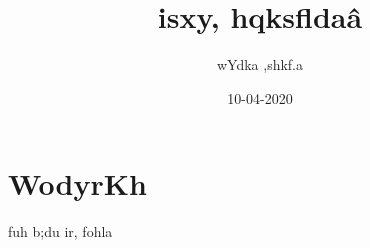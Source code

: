 \documentclass[12pt]{article}
\title{isxy, \fontencoding{T1}\fontfamily{cmr}\selectfont{Latex} \normalfont  hqksfldaâ}
\author{wYdka ,shkf.a}
\date{10-04-2020}
\begin{document}
\maketitle


\section{WodyrKh}
fuh b;du ir, fohla  
\end{document}
